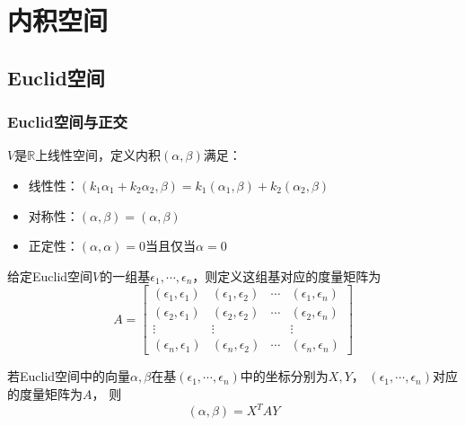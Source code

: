 

\chapter{内积空间}


\section{Euclid空间}

\subsection{Euclid空间与正交}

\begin{definition}[欧式空间]
  $V$是$\mathbb{R}$上线性空间，定义内积$(\alpha,\beta)$满足：
  \begin{itemize}
  \item 线性性：$(k_1\alpha_1 + k_2 \alpha_2,\beta) = k_1(\alpha_1,\beta) + k_2(\alpha_2,\beta)$
  \item 对称性：$(\alpha,\beta) = (\alpha,\beta)$
  \item 正定性：$(\alpha,\alpha) = 0$当且仅当$\alpha = 0$
  \end{itemize}
\end{definition}

\begin{definition}[度量矩阵]
  给定Euclid空间$V$的一组基$\epsilon_1,\cdots,\epsilon_n$，则定义这组基对应的度量矩阵为
  \begin{equation*}
    A = \left[
      \begin{array}{cccc}
        (\epsilon_1,\epsilon_1)&(\epsilon_1,\epsilon_2)&\cdots&(\epsilon_1,\epsilon_n) \\
                               (\epsilon_2,\epsilon_1)&(\epsilon_2,\epsilon_2)&\cdots&(\epsilon_2,\epsilon_n) \\
                               \vdots&\vdots&&\vdots \\
                               (\epsilon_n,\epsilon_1)&(\epsilon_n,\epsilon_2)&\cdots&(\epsilon_n,\epsilon_n)
      \end{array}
    \right]
  \end{equation*}
\end{definition}

\begin{theorem}[内积的度量矩阵表示]
  若Euclid空间中的向量$\alpha,\beta$在基$(\epsilon_1,\cdots,\epsilon_n)$中的坐标分别为$X,Y$，
  $(\epsilon_1,\cdots,\epsilon_n)$对应的度量矩阵为$A$，
  则
  \begin{equation*}
    (\alpha,\beta) = X^TAY
  \end{equation*}
\end{theorem}

